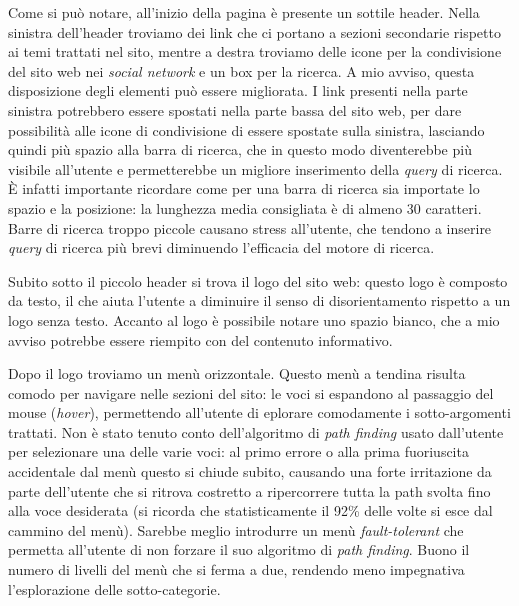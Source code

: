 Come si pu\`o notare, all'inizio della pagina \`e presente un sottile header. Nella sinistra dell'header troviamo dei link che ci portano a sezioni secondarie rispetto ai temi trattati nel sito, mentre a destra troviamo delle icone per la condivisione del sito web nei \textit{social network} e un box per la ricerca.
A mio avviso, questa disposizione degli elementi pu\`o essere migliorata. I link presenti nella parte sinistra potrebbero essere spostati nella parte bassa del sito web, per dare possibilit\`a alle icone di condivisione di essere spostate sulla sinistra, lasciando quindi pi\`u spazio alla barra di ricerca, che in questo modo diventerebbe pi\`u visibile all'utente e permetterebbe un migliore inserimento della \textit{query} di ricerca. \`E infatti importante ricordare come per una barra di ricerca sia importate lo spazio e la posizione: la lunghezza media consigliata \`e di almeno 30 caratteri. Barre di ricerca troppo piccole causano stress all'utente, che tendono a inserire \textit{query} di ricerca pi\`u brevi diminuendo l'efficacia del motore di ricerca.


Subito sotto il piccolo header si trova il logo del sito web: questo logo \`e composto da testo, il che aiuta l'utente a diminuire il senso di disorientamento rispetto a un logo senza testo.
Accanto al logo \`e possibile notare uno spazio bianco, che a mio avviso potrebbe essere riempito con del contenuto informativo.


Dopo il logo troviamo un men\`u orizzontale. Questo men\`u a tendina risulta comodo per navigare nelle sezioni del sito: le voci si espandono al passaggio del mouse (\textit{hover}), permettendo all'utente di eplorare comodamente i sotto-argomenti trattati. Non \`e stato tenuto conto dell'algoritmo di \textit{path finding} usato dall'utente per selezionare una delle varie voci: al primo errore o alla prima fuoriuscita accidentale dal men\`u questo si chiude subito, causando una forte irritazione da parte dell'utente che si ritrova costretto a ripercorrere tutta la path svolta fino alla voce desiderata (si ricorda che statisticamente il 92\% delle volte si esce dal cammino del men\`u). Sarebbe meglio introdurre un men\`u \textit{fault-tolerant} che permetta all'utente di non forzare il suo algoritmo di \textit{path finding}. Buono il numero di livelli del men\`u che si ferma a due, rendendo meno impegnativa l'esplorazione delle sotto-categorie.

